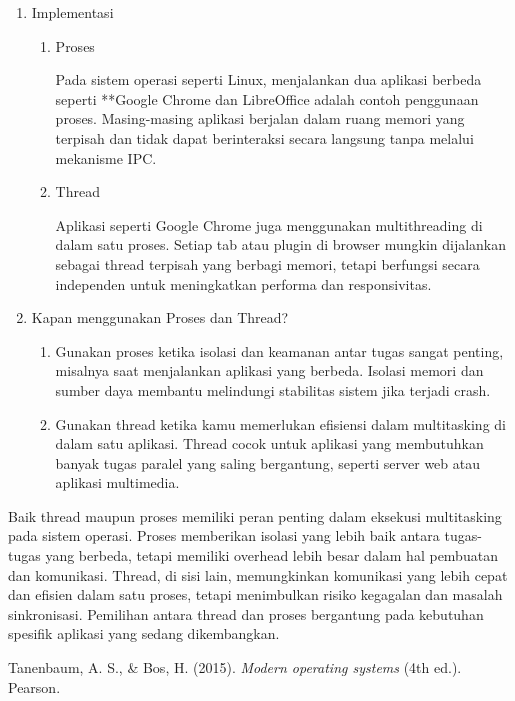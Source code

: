 \documentclass[12pt]{article}
\begin{document}
\begin{enumerate}
\begin{enumerate}
\begin{enumerate}
		            \end{enumerate}
	      \end{enumerate}
	\item Implementasi
	      \begin{enumerate}
		      \item Proses

		            Pada sistem operasi seperti Linux, menjalankan dua aplikasi berbeda seperti **Google Chrome dan LibreOffice adalah contoh penggunaan proses. Masing-masing aplikasi berjalan dalam ruang memori yang terpisah dan tidak dapat berinteraksi secara langsung tanpa melalui mekanisme IPC.
		      \item Thread

		            Aplikasi seperti Google Chrome juga menggunakan multithreading di dalam satu proses. Setiap tab atau plugin di browser mungkin dijalankan sebagai thread terpisah yang berbagi memori, tetapi berfungsi secara independen untuk meningkatkan performa dan responsivitas.

	      \end{enumerate}
	\item Kapan menggunakan Proses dan Thread?
	      \begin{enumerate}
		      \item Gunakan proses ketika isolasi dan keamanan antar tugas sangat penting, misalnya saat menjalankan aplikasi yang berbeda. Isolasi memori dan sumber daya membantu melindungi stabilitas sistem jika terjadi crash.
		      \item Gunakan thread ketika kamu memerlukan efisiensi dalam multitasking di dalam satu aplikasi. Thread cocok untuk aplikasi yang membutuhkan banyak tugas paralel yang saling bergantung, seperti server web atau aplikasi multimedia.

	      \end{enumerate}
\end{enumerate}
Baik thread maupun proses memiliki peran penting dalam eksekusi multitasking pada sistem operasi. Proses memberikan isolasi yang lebih baik antara tugas-tugas yang berbeda, tetapi memiliki overhead lebih besar dalam hal pembuatan dan komunikasi. Thread, di sisi lain, memungkinkan komunikasi yang lebih cepat dan efisien dalam satu proses, tetapi menimbulkan risiko kegagalan dan masalah sinkronisasi. Pemilihan antara thread dan proses bergantung pada kebutuhan spesifik aplikasi yang sedang dikembangkan.


Tanenbaum, A. S., \& Bos, H. (2015). \textit{Modern operating systems} (4th ed.). Pearson.
\end{document}
